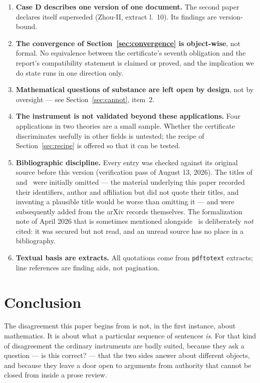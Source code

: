 \documentclass[11pt,a4paper]{article}
\theoremstyle{definition}
\newcommand{\anchor}[2]{(#1, extract l.~#2)}
\begin{document}
\begin{enumerate}
  Part~5~\cite{GeigerSubstance2026}, as has the source examination underlying
  the first~\cite{GeigerGNC2026}.
\item \textbf{Case D describes one version of one document.} The second paper
  declares itself superseded \anchor{Zhou-II}{10}. Its findings are version-bound.
\item \textbf{The convergence of Section~\ref{sec:convergence} is object-wise},
  not formal. No equivalence between the certificate's seventh obligation and the
  report's compatibility statement is claimed or proved, and the implication we do
  state runs in one direction only.
\item \textbf{Mathematical questions of substance are left open by design}, not by
  oversight --- see Section~\ref{sec:cannot}, item~2.
\item \textbf{The instrument is not validated beyond these applications.} Four
  applications in two theories are a small sample. Whether the certificate
  discriminates usefully in other fields is untested; the recipe of
  Section~\ref{sec:recipe} is offered so that it can be tested.
\item \label{lim:biblio} \textbf{Bibliographic discipline.} Every entry was
  checked against its original source before this version (verification pass of
  August 13, 2026). The titles of~\cite{ZhouI} and~\cite{ZhouII} were initially
  omitted --- the material underlying this paper recorded their identifiers,
  author and affiliation but did not quote their titles, and inventing a
  plausible title would be worse than omitting it --- and were subsequently
  added from the arXiv records themselves. The formalization note of April 2026
  that is sometimes mentioned alongside~\cite{LANA2026} is deliberately
  \emph{not} cited: it was secured but not read, and an unread source has no
  place in a bibliography.
\item \textbf{Textual basis are extracts.} All quotations come from
  \texttt{pdftotext} extracts; line references are finding aids, not pagination.
\end{enumerate}

\section{Conclusion}
\label{sec:conclusion}

The disagreement this paper begins from is not, in the first instance, about
mathematics. It is about what a particular sequence of sentences \emph{is}. For
that kind of disagreement the ordinary instruments are badly suited, because they
ask a question --- is this correct? --- that the two sides answer about different
objects, and because they leave a door open to arguments from authority that
cannot be closed from inside a prose review.
\end{document}
